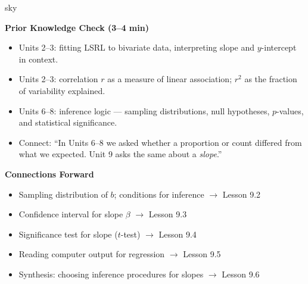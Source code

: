 \documentclass[10pt]{article}
\begin{document}
\begin{skillbox}{sky}
\begin{minipage}[t]{0.48\linewidth}
    \textbf{Prior Knowledge Check (3--4 min)}
    \begin{itemize}
        \item Units 2--3: fitting LSRL to bivariate data, interpreting slope and
              $y$-intercept in context.
        \item Units 2--3: correlation $r$ as a measure of linear association;
              $r^2$ as the fraction of variability explained.
        \item Units 6--8: inference logic --- sampling distributions, null hypotheses,
              $p$-values, and statistical significance.
        \item Connect: ``In Units 6--8 we asked whether a proportion or count differed
              from what we expected. Unit 9 asks the same about a \emph{slope}.''
    \end{itemize}
\end{minipage}
\hfill
\begin{minipage}[t]{0.48\linewidth}
    \textbf{Connections Forward}
    \begin{itemize}
        \item Sampling distribution of $b$; conditions for inference $\to$ Lesson 9.2
        \item Confidence interval for slope $\beta$ $\to$ Lesson 9.3
        \item Significance test for slope ($t$-test) $\to$ Lesson 9.4
        \item Reading computer output for regression $\to$ Lesson 9.5
        \item Synthesis: choosing inference procedures for slopes $\to$ Lesson 9.6
    \end{itemize}
\end{minipage}
\end{skillbox}
\end{document}
